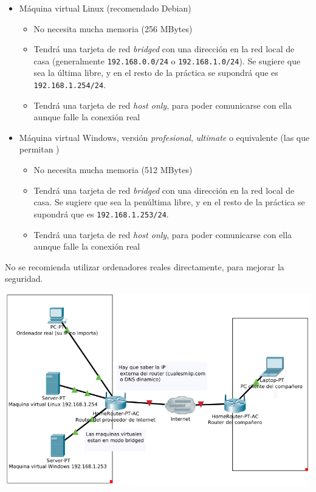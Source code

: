 \begin{itemize}
\item Máquina virtual Linux (recomendado Debian)
  \begin{itemize}
  \item No necesita mucha memoria (256 MBytes)
  \item Tendrá una tarjeta de red \textit{bridged} con una dirección en la red local de casa (generalmente \texttt{192.168.0.0/24} o \texttt{192.168.1.0/24}). Se sugiere que sea la última libre, y en el resto de la práctica se supondrá que es \texttt{192.168.1.254/24}.
  \item Tendrá una tarjeta de red \textit{host only}, para poder comunicarse con ella aunque falle la conexión real 
  \end{itemize}

\item Máquina virtual Windows, versión \textit{profesional}, \textit{ultimate} o equivalente (las que permitan )
  \begin{itemize}
  \item No necesita mucha memoria (512 MBytes)    
  \item Tendrá una tarjeta de red \textit{bridged} con una dirección en la red local de casa. Se sugiere que sea la penúltima libre, y en el resto de la práctica se supondrá que es \texttt{192.168.1.253/24}.
  \item Tendrá una tarjeta de red \textit{host only}, para poder comunicarse con ella aunque falle la conexión real 
  \end{itemize}
\end{itemize}

No se recomienda utilizar ordenadores reales directamente, para mejorar la seguridad.

\includegraphics[width=\textwidth]{./media/practica-nat-en-casa.png}


